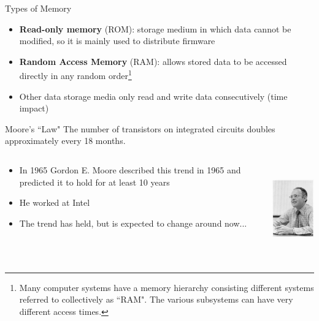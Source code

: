 \documentclass[xcolor=x11names,compress]{beamer}
\renewcommand{\(}{\begin{columns}}
\renewcommand{\)}{\end{columns}}
\newcommand{\<}[1]{\begin{column}{#1}}
\renewcommand{\>}{\end{column}}
\begin{document}
\begin{frame}{Types of Memory}
\begin{itemize}
\item \textbf{Read-only memory} (ROM): storage medium in which data cannot be modified, so it is mainly used to distribute firmware 
\item \textbf{Random Access Memory} (RAM): allows stored data to be accessed directly in any random order\footnote{Many computer systems have a memory hierarchy consisting different systems referred to collectively as ``RAM". The various subsystems can have very different access times.}
\item Other data storage media only read and write data consecutively (time impact)
\end{itemize}
\end{frame}

\begin{frame}{Moore's ``Law"}
The number of transistors on integrated circuits doubles approximately every 18 months. 

\begin{columns}
  \begin{column}{0.7\textwidth}
\begin{itemize}
\item In 1965 Gordon E. Moore described this trend in 1965 and predicted it to hold for at least 10 years
\item He worked at Intel
\item The trend has held, but is expected to change around now...
\end{itemize}
  \end{column}
  \begin{column}{0.3\textwidth}
    \includegraphics[height=1.5in,clip]{GordonMoore1975}
  \end{column}
\end{columns}
\end{frame}
\end{document}
